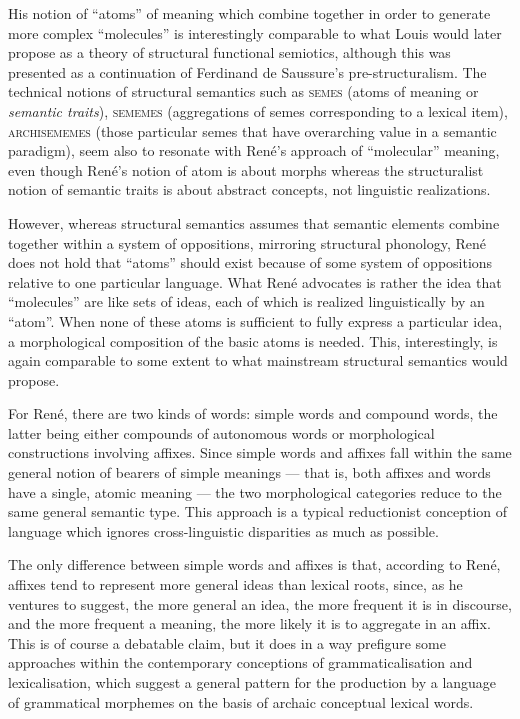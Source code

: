 \documentclass[output=paper]{langsci/langscibook}
\begin{document}
His notion of ``atoms'' of meaning which combine together in order to
generate more complex ``molecules'' is interestingly comparable to what
Louis \citet{hjelmslev43:prolegomena} would later propose as a theory
of structural functional semiotics, although this was presented as a
continuation of Ferdinand de Saussure’s pre-structuralism. The
technical notions of structural semantics such as \textsc{semes} (atoms
of meaning or \emph{semantic traits}), \textsc{sememes} (aggregations of
semes corresponding to a lexical item), \textsc{archisememes} (those
particular semes that have overarching value in a semantic paradigm),
seem also to resonate with René’s approach of ``molecular'' meaning, even
though René’s notion of atom is about morphs whereas the structuralist
notion of semantic traits is about abstract concepts, not linguistic
realizations.

However, whereas structural semantics assumes that semantic elements
combine together within a system of oppositions, mirroring structural
phonology, René does not hold that ``atoms'' should exist because of some
system of oppositions relative to one particular language. What René
advocates is rather the idea that ``molecules'' are like sets of ideas,
each of which is realized linguistically by an ``atom''. When none of
these atoms is sufficient to fully express a particular idea, a
morphological composition of the basic atoms is needed. This,
interestingly, is again comparable to some extent to what mainstream
structural semantics would propose.

For René, there are two kinds of words: simple words and compound
words, the latter being either compounds of autonomous words or
morphological constructions involving affixes. Since simple words and
affixes fall within the same general notion of bearers of simple
meanings --- that is, both affixes and words have a single, atomic
meaning --- the two morphological categories reduce to the same
general semantic type. This approach is a typical reductionist
conception of language which ignores cross-linguistic disparities as
much as possible.

The only difference between simple words and affixes is that,
according to René, affixes tend to represent more general ideas than
lexical roots, since, as he ventures to suggest, the more general an
idea, the more frequent it is in discourse, and the more frequent a
meaning, the more likely it is to aggregate in an affix. This is of
course a debatable claim, but it does in a way prefigure some
approaches within the contemporary conceptions of grammaticalisation
and lexicalisation, which suggest a general pattern for the production
by a language of grammatical morphemes on the basis of archaic
conceptual lexical words. 
\end{document}
